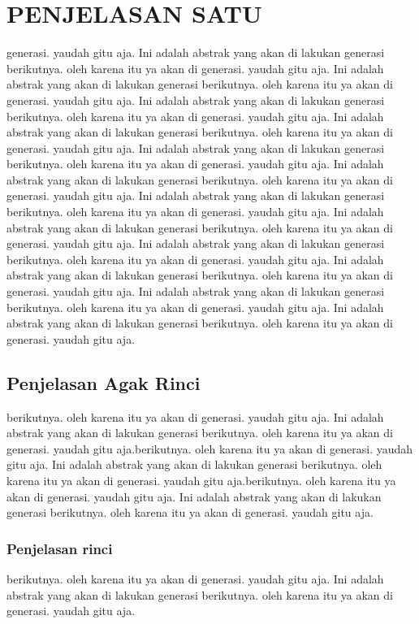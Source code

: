 \section{PENJELASAN SATU}
generasi. yaudah gitu aja. Ini adalah abstrak yang akan di lakukan generasi berikutnya. oleh karena itu ya akan di generasi. yaudah gitu aja. Ini adalah abstrak yang akan di lakukan generasi berikutnya. oleh karena itu ya akan di generasi. yaudah gitu aja. Ini adalah abstrak yang akan di lakukan generasi berikutnya. oleh karena itu ya akan di generasi. yaudah gitu aja. Ini adalah abstrak yang akan di lakukan generasi berikutnya. oleh karena itu ya akan di generasi. yaudah gitu aja. Ini adalah abstrak yang akan di lakukan generasi berikutnya. oleh karena itu ya akan di generasi. yaudah gitu aja. Ini adalah abstrak yang akan di lakukan generasi berikutnya. oleh karena itu ya akan di generasi. yaudah gitu aja. Ini adalah abstrak yang akan di lakukan generasi berikutnya. oleh karena itu ya akan di generasi. yaudah gitu aja. Ini adalah abstrak yang akan di lakukan generasi berikutnya. oleh karena itu ya akan di generasi. yaudah gitu aja. Ini adalah abstrak yang akan di lakukan generasi berikutnya. oleh karena itu ya akan di generasi. yaudah gitu aja. Ini adalah abstrak yang akan di lakukan generasi berikutnya. oleh karena itu ya akan di generasi. yaudah gitu aja. Ini adalah abstrak yang akan di lakukan generasi berikutnya. oleh karena itu ya akan di generasi. yaudah gitu aja. Ini adalah abstrak yang akan di lakukan generasi berikutnya. oleh karena itu ya akan di generasi. yaudah gitu aja.

\subsection{Penjelasan Agak Rinci}
berikutnya. oleh karena itu ya akan di generasi. yaudah gitu aja. Ini adalah abstrak yang akan di lakukan generasi berikutnya. oleh karena itu ya akan di generasi. yaudah gitu aja.berikutnya. oleh karena itu ya akan di generasi. yaudah gitu aja. Ini adalah abstrak yang akan di lakukan generasi berikutnya. oleh karena itu ya akan di generasi. yaudah gitu aja.berikutnya. oleh karena itu ya akan di generasi. yaudah gitu aja. Ini adalah abstrak yang akan di lakukan generasi berikutnya. oleh karena itu ya akan di generasi. yaudah gitu aja.
\subsubsection{Penjelasan rinci}
berikutnya. oleh karena itu ya akan di generasi. yaudah gitu aja. Ini adalah abstrak yang akan di lakukan generasi berikutnya. oleh karena itu ya akan di generasi. yaudah gitu aja.
